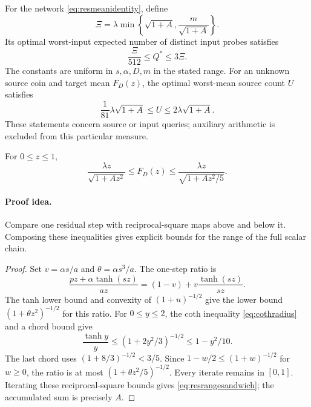 \begin{theorem}
\label{thm:resmeanlaw}
For the network \eqref{eq:resmeanidentity}, define
\[
\Xi=\lambda\min\left\{\sqrt{1+A},\frac m{\sqrt{1+A}}\right\}.
\]
Its optimal worst-input expected number of distinct input probes
satisfies
\begin{equation}\label{eq:resmeanlaw}
\frac\Xi{512}\le Q^*\le3\Xi.
\end{equation}
The constants are uniform in $s,\alpha,D,m$ in the stated range.
For an unknown source coin and target mean $F_D(z)$, the optimal
worst-mean source count $U$ satisfies
\begin{equation}\label{eq:resunknownlaw}
\frac1{81}\lambda\sqrt{1+A}\le U
\le2\lambda\sqrt{1+A}.
\end{equation}
These statements concern source or input queries; auxiliary
arithmetic is excluded from this particular measure.
\end{theorem}

\begin{lemma}\label{lem:resrange}
For $0\le z\le1$,
\begin{equation}\label{eq:resrangesandwich}
\frac{\lambda z}{\sqrt{1+Az^2}}
\le F_D(z)\le
\frac{\lambda z}{\sqrt{1+Az^2/5}}.
\end{equation}
\end{lemma}
\paragraph{Proof idea.}
Compare one residual step with reciprocal-square maps above and below it.
Composing these inequalities gives explicit bounds for the range of the full
scalar chain.

\begin{proof}
Set $v=\alpha s/a$ and $\theta=\alpha s^3/a$.
The one-step ratio is
\[
\frac{p z+\alpha\tanh(sz)}{az}
=(1-v)+v\frac{\tanh(sz)}{sz}.
\]
The tanh lower bound and convexity of $(1+u)^{-1/2}$ give the lower
bound $(1+\theta z^2)^{-1/2}$ for this ratio.
For $0\le y\le2$, the coth inequality \eqref{eq:cothradius} and a
chord bound give
\[
\frac{\tanh y}y\le(1+2y^2/3)^{-1/2}\le1-y^2/10.
\]
The last chord uses $(1+8/3)^{-1/2}<3/5$.
Since $1-w/2\le(1+w)^{-1/2}$ for $w\ge0$, the ratio is at most
$(1+\theta z^2/5)^{-1/2}$.
Every iterate remains in $[0,1]$.
Iterating these reciprocal-square bounds gives
\eqref{eq:resrangesandwich}; the accumulated sum is precisely $A$.
\end{proof}

